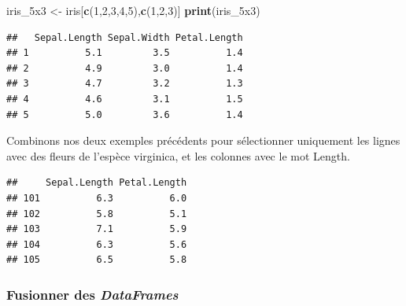 \documentclass[
  11pt,
  french,
]{book}
\makeatletter
\newenvironment{Shaded}{\begin{snugshade}}{\end{snugshade}}
\newcommand{\DataTypeTok}[1]{\textcolor[rgb]{0.13,0.29,0.53}{#1}}
\newcommand{\DecValTok}[1]{\textcolor[rgb]{0.00,0.00,0.81}{#1}}
\newcommand{\KeywordTok}[1]{\textcolor[rgb]{0.13,0.29,0.53}{\textbf{#1}}}
\newcommand{\NormalTok}[1]{#1}
\newcommand{\OperatorTok}[1]{\textcolor[rgb]{0.81,0.36,0.00}{\textbf{#1}}}
\newcommand{\OtherTok}[1]{\textcolor[rgb]{0.56,0.35,0.01}{#1}}
\newcommand{\StringTok}[1]{\textcolor[rgb]{0.31,0.60,0.02}{#1}}
\newenvironment{kframe}{%
\medskip{}
\setlength{\fboxsep}{.8em}
 \def\at@end@of@kframe{}%
 \ifinner\ifhmode%
  \def\at@end@of@kframe{\end{minipage}}%
  \begin{minipage}{\columnwidth}%
 \fi\fi%
 \def\FrameCommand##1{\hskip\@totalleftmargin \hskip-\fboxsep
 \colorbox{shadecolor}{##1}\hskip-\fboxsep
     \hskip-\linewidth \hskip-\@totalleftmargin \hskip\columnwidth}%
 \MakeFramed {\advance\hsize-\width
   \@totalleftmargin\z@ \linewidth\hsize
   \@setminipage}}%
 {\par\unskip\endMakeFramed%
 \at@end@of@kframe}
\renewenvironment{Shaded}{\begin{kframe}}{\end{kframe}}
\makeatother
\begin{document}
\begin{Shaded}
\begin{Highlighting}[]
\NormalTok{iris_5x3 <-}\StringTok{ }\NormalTok{iris[}\KeywordTok{c}\NormalTok{(}\DecValTok{1}\NormalTok{,}\DecValTok{2}\NormalTok{,}\DecValTok{3}\NormalTok{,}\DecValTok{4}\NormalTok{,}\DecValTok{5}\NormalTok{),}\KeywordTok{c}\NormalTok{(}\DecValTok{1}\NormalTok{,}\DecValTok{2}\NormalTok{,}\DecValTok{3}\NormalTok{)]}
\KeywordTok{print}\NormalTok{(iris_5x3)}
\end{Highlighting}
\end{Shaded}

\begin{verbatim}
##   Sepal.Length Sepal.Width Petal.Length
## 1          5.1         3.5          1.4
## 2          4.9         3.0          1.4
## 3          4.7         3.2          1.3
## 4          4.6         3.1          1.5
## 5          5.0         3.6          1.4
\end{verbatim}

Combinons nos deux exemples précédents pour sélectionner uniquement les lignes avec des fleurs de l'espèce virginica, et les colonnes avec le mot Length.

\begin{Shaded}
\end{Shaded}

\begin{verbatim}
##     Sepal.Length Petal.Length
## 101          6.3          6.0
## 102          5.8          5.1
## 103          7.1          5.9
## 104          6.3          5.6
## 105          6.5          5.8
\end{verbatim}

\hypertarget{sect01429}{%
\subsubsection{\texorpdfstring{Fusionner des \emph{DataFrames}}{Fusionner des DataFrames}}\label{sect01429}}
\end{document}
